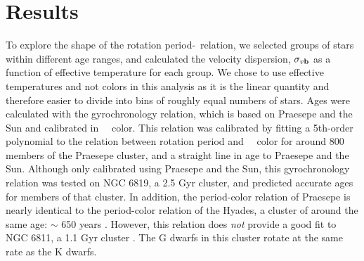 \section{Results}

To explore the shape of the rotation period-\teff\ relation, we selected
groups of stars within different age ranges, and calculated the velocity
dispersion, $\sigma_{v{\bf b}}$ as a function of effective temperature for
each group.
We chose to use effective temperatures and not colors in this analysis as it
is the linear quantity and therefore easier to divide into bins of roughly
equal numbers of stars.
Ages were calculated with the \citet{angus2019} gyrochronology relation, which
is based on Praesepe and the Sun and calibrated in \gaia\ \gcolor\ color.
This relation was calibrated by fitting a 5th-order polynomial to the relation
between rotation period and \gaia\ \gcolor\ color for around 800 members of
the Praesepe cluster, and a straight line in age to Praesepe and the Sun.
Although only calibrated using Praesepe and the Sun, this gyrochronology
relation was tested on NGC 6819, a 2.5 Gyr cluster, and predicted accurate
ages for members of that cluster.
In addition, the period-color relation of Praesepe is nearly identical to the
period-color relation of the Hyades, a cluster of around the same age: $\sim$
650 years \citep{douglas2019}.
However, this relation does {\it not} provide a good fit to NGC 6811, a 1.1
Gyr cluster \citep{curtis2019}.
The G dwarfs in this cluster rotate at the same rate as the K dwarfs.

